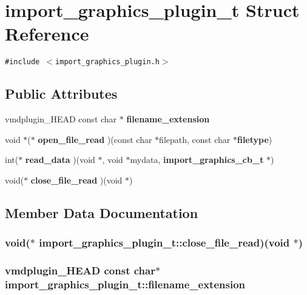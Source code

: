 \section{import\_\-graphics\_\-plugin\_\-t  Struct Reference}
\label{structimport__graphics__plugin__t}
{\tt \#include $<$import\_\-graphics\_\-plugin.h$>$}

\subsection*{Public Attributes}
\begin{CompactItemize}
\item 
vmdplugin\_\-HEAD const char $\ast$ {\bf filename\_\-extension}
\item 
void $\ast$($\ast$ {\bf open\_\-file\_\-read} )(const char $\ast$filepath, const char $\ast${\bf filetype})
\item 
int($\ast$ {\bf read\_\-data} )(void $\ast$, void $\ast$mydata, {\bf import\_\-graphics\_\-cb\_\-t} $\ast$)
\item 
void($\ast$ {\bf close\_\-file\_\-read} )(void $\ast$)
\end{CompactItemize}


\subsection{Member Data Documentation}
\subsubsection{\setlength{\rightskip}{0pt plus 5cm}void($\ast$  import\_\-graphics\_\-plugin\_\-t::close\_\-file\_\-read)(void $\ast$)}\label{structimport__graphics__plugin__t_m3}


\subsubsection{\setlength{\rightskip}{0pt plus 5cm}vmdplugin\_\-HEAD const char$\ast$ import\_\-graphics\_\-plugin\_\-t::filename\_\-extension}\label{structimport__graphics__plugin__t_m0}




